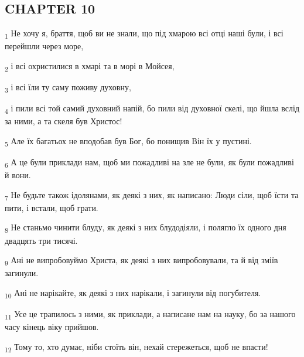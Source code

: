 \subsection{CHAPTER 10}
\begin{tcolorbox}
\textsubscript{1} Не хочу я, браття, щоб ви не знали, що під хмарою всі отці наші були, і всі перейшли через море,
\end{tcolorbox}
\begin{tcolorbox}
\textsubscript{2} і всі охристилися в хмарі та в морі в Мойсея,
\end{tcolorbox}
\begin{tcolorbox}
\textsubscript{3} і всі їли ту саму поживу духовну,
\end{tcolorbox}
\begin{tcolorbox}
\textsubscript{4} і пили всі той самий духовний напій, бо пили від духовної скелі, що йшла вслід за ними, а та скеля був Христос!
\end{tcolorbox}
\begin{tcolorbox}
\textsubscript{5} Але їх багатьох не вподобав був Бог, бо понищив Він їх у пустині.
\end{tcolorbox}
\begin{tcolorbox}
\textsubscript{6} А це були приклади нам, щоб ми пожадливі на зле не були, як були пожадливі й вони.
\end{tcolorbox}
\begin{tcolorbox}
\textsubscript{7} Не будьте також ідолянами, як деякі з них, як написано: Люди сіли, щоб їсти та пити, і встали, щоб грати.
\end{tcolorbox}
\begin{tcolorbox}
\textsubscript{8} Не станьмо чинити блуду, як деякі з них блудодіяли, і полягло їх одного дня двадцять три тисячі.
\end{tcolorbox}
\begin{tcolorbox}
\textsubscript{9} Ані не випробовуймо Христа, як деякі з них випробовували, та й від зміїв загинули.
\end{tcolorbox}
\begin{tcolorbox}
\textsubscript{10} Ані не нарікайте, як деякі з них нарікали, і загинули від погубителя.
\end{tcolorbox}
\begin{tcolorbox}
\textsubscript{11} Усе це трапилось з ними, як приклади, а написане нам на науку, бо за нашого часу кінець віку прийшов.
\end{tcolorbox}
\begin{tcolorbox}
\textsubscript{12} Тому то, хто думає, ніби стоїть він, нехай стережеться, щоб не впасти!
\end{tcolorbox}
